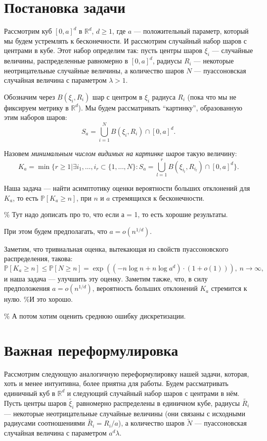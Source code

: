 \documentclass[12pt]{article}
\theoremstyle{plain}
\theoremstyle{definition}
\theoremstyle{remark}
\def\geq{\geqslant}
\def\leq{\leqslant}
\newcommand{\cuplim}{\bigcup\limits}
\newcommand{\R}{\mathbb{R}}
\newcommand{\PP}{\mathbb{P}}
\newcommand{\til}{\widetilde}
\begin{document}
\section{Постановка задачи}

Рассмотрим куб $[0,a]^d$ в $\R^d$, $d \geq 1$, где $a$ --- положительный параметр, который мы будем устремлять к бесконечности. И рассмотрим  случайный набор шаров с центрами в кубе. Этот набор определим так: пусть  центры шаров $\xi_i$ --- случайные величины, распределенные равномерно в $[0,a]^d$, радиусы $R_i$ --- некоторые неотрицательные случайные величины, а количество шаров $N$ --- пуассоновская случайная величина с параметром $\lambda > 1$. 

Обозначим через $B(\xi_i, R_i)$ шар с центром в $\xi_i$ радиуса $R_i$ (пока что мы не фиксируем метрику в $\R^d$).
Мы будем рассматривать  ``картинку'', образованную этим наборов шаров:
$$S_a = \cuplim_{i=1}^N B(\xi_i, R_i) \cap [0,a]^d.$$

Назовем {\it минимальным числом видимых на картинке шаров} такую величину: $$K_a = \min \{r \geq 1 | \exists i_1, \ldots , i_r \subset \{1, \ldots , N\} : S_a = \cuplim_{l=1}^r B(\xi_{i_l}, R_{i_l}) \cap [0,a]^d\}.$$

Наша задача --- найти асимптотику оценки вероятности больших отклонений для $K_a$, то есть  $\PP[K_a \geq n]$, при $n$ и $a$ стремящихся к бесконечности. 

\% Тут надо дописать про то, что если а = 1, то есть хорошие результаты. 

При этом будем предполагать, что $a = o(n^{1/d})$.

Заметим, что тривиальная оценка, вытекающая из свойств пуассоновского распределения, такова:
$$\PP[K_a \geq n] \leq \PP[N\geq n] = \exp((-n\log n + n\log a^d )\cdot(1 + o(1))), \ n\to \infty,$$
и наша задача --- улучшить эту оценку. Заметим также, что, в силу предположения $a = o(n^{1/d})$, вероятность больших отклонений $K_a$ стремится к нулю. \%И это хорошо.

\% А потом хотим оценить среднюю ошибку дискретизации. 


\section{Важная переформулировка}

Рассмотрим следующую аналогичную переформулировку нашей задачи, которая, хоть и менее интуитивна, более приятна для работы. Будем рассматривать единичный куб в $\R^d$ и следующий случайный набор шаров с центрами в нём. Пусть центры шаров $\til{\xi_i}$ равномерно распределены в единичном кубе, радиусы $\til{R_i}$ --- некоторые неотрицательные случайные величины (они связаны с исходными радиусами соотношениями $\til{R_i} = R_i/a$), а количество шаров $\til{N}$ --- пуассоновская случайная величина с параметром $a^d\lambda$.
\end{document}
